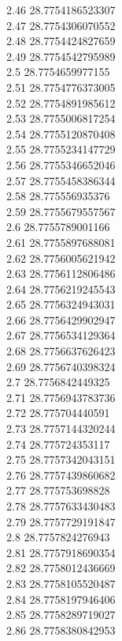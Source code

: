 {2.46	28.7754186523307\\
2.47	28.7754306070552\\
2.48	28.7754424827659\\
2.49	28.7754542795989\\
2.5	28.7754659977155\\
2.51	28.7754776373005\\
2.52	28.7754891985612\\
2.53	28.7755006817254\\
2.54	28.7755120870408\\
2.55	28.7755234147729\\
2.56	28.7755346652046\\
2.57	28.7755458386344\\
2.58	28.775556935376\\
2.59	28.7755679557567\\
2.6	28.7755789001166\\
2.61	28.7755897688081\\
2.62	28.7756005621942\\
2.63	28.7756112806486\\
2.64	28.7756219245543\\
2.65	28.7756324943031\\
2.66	28.7756429902947\\
2.67	28.7756534129364\\
2.68	28.7756637626423\\
2.69	28.7756740398324\\
2.7	28.7756842449325\\
2.71	28.7756943783736\\
2.72	28.775704440591\\
2.73	28.7757144320244\\
2.74	28.775724353117\\
2.75	28.7757342043151\\
2.76	28.7757439860682\\
2.77	28.775753698828\\
2.78	28.7757633430483\\
2.79	28.7757729191847\\
2.8	28.7757824276943\\
2.81	28.7757918690354\\
2.82	28.7758012436669\\
2.83	28.7758105520487\\
2.84	28.7758197946406\\
2.85	28.7758289719027\\
2.86	28.7758380842953\\
}
